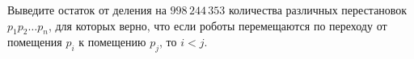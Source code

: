 Выведите остаток от деления на $998\,244\,353$ количества различных перестановок $p_1 p_2 \ldots p_n$, для которых верно, что если роботы перемещаются по переходу от помещения $p_i$ к помещению $p_j$, то $i < j$.